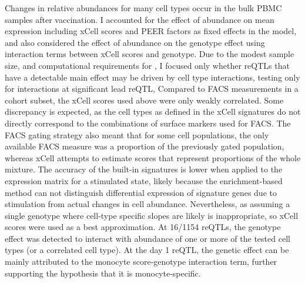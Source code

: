 Changes in relative abundances for many cell types occur in the bulk PBMC samples after vaccination.
I accounted for the effect of abundance on mean expression including xCell scores and PEER factors as fixed effects in the model,
and also considered the effect of abundance on the genotype effect using interaction terms between xCell scores and genotype.
Due to the modest sample size, and computational requirements for , 
I focused only whether reQTLs that have a detectable main effect may be driven by cell type interactions,
testing only for interactions at significant lead \gls{reQTL},
%
Compared to FACS measurements in a cohort subset, the xCell scores used above were only weakly correlated.
Some discrepancy is expected, as the cell types as defined in the xCell signatures do not directly correspond to the combinations of surface markers used for FACS.
The FACS gating strategy also meant that for some cell populations, the only available FACS measure was a proportion of the previously gated population,
whereas xCell attempts to estimate scores that represent proportions of the whole mixture.
The accuracy of the built-in signatures is lower when applied to the expression matrix for a stimulated state,
likely because the enrichment-based method can not distinguish differential expression of signature genes due to stimulation from actual changes in cell abundance.
Nevertheless, as assuming a single genotype where cell-type specific slopes are likely is inappropriate, so xCell scores were used as a best approximation.
%
At 16/1154 reQTLs, the genotype effect was detected to interact with abundance of one or more of the tested cell types (or a correlated cell type).
At the day 1  reQTL, the genetic effect can be mainly attributed to the monocyte score-genotype interaction term, further supporting the hypothesis that it is monocyte-specific.


